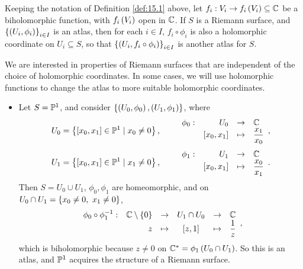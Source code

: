 \begin{remark}
Keeping the notation of Definition \ref{def:15.1} above, let $ f_i : V_i \to f_i\rb{V_i} \subseteq \C $ be a biholomorphic function, with $ f_i\rb{V_i} $ open in $ \C $. If $ S $ is a Riemann surface, and $ \cb{\rb{U_i, \phi_i}}_{i \in I} $ is an atlas, then for each $ i \in I $, $ f_i \circ \phi_i $ is also a holomorphic coordinate on $ U_i \subseteq S $, so that $ \cb{\rb{U_i, f_i \circ \phi_i}}_{i \in I} $ is another atlas for $ S $.
\end{remark}

We are interested in properties of Riemann surfaces that are independent of the choice of holomorphic coordinates. In some cases, we will use holomorphic functions to change the atlas to more suitable holomorphic coordinates.

\begin{example}
\hfill
\begin{itemize}
\item Let $ S = \P^1 $, and consider $ \cb{\rb{U_0, \phi_0}, \rb{U_1, \phi_1}} $, where
$$ U_0 = \cb{\sb{x_0, x_1} \in \P^1 \mid x_0 \ne 0}, \qquad \function[\phi_0]{U_0}{\C}{\sb{x_0, x_1}}{\dfrac{x_1}{x_0}}, $$
$$ U_1 = \cb{\sb{x_0, x_1} \in \P^1 \mid x_1 \ne 0}, \qquad \function[\phi_1]{U_1}{\C}{\sb{x_0, x_1}}{\dfrac{x_0}{x_1}}. $$
Then $ S = U_0 \cup U_1 $, $ \phi_0, \phi_1 $ are homeomorphic, and on $ U_0 \cap U_1 = \cb{x_0 \ne 0, \ x_1 \ne 0} $,
$$
\begin{array}{crcccl}
\phi_0 \circ \phi_1^{-1} : & \C \setminus \cb{0} & \to & U_1 \cap U_0 & \to & \C \\
& z & \mapsto & \sb{z, 1} & \mapsto & \dfrac{1}{z}
\end{array},
$$
which is biholomorphic because $ z \ne 0 $ on $ \C^* = \phi_1\rb{U_0 \cap U_1} $. So this is an atlas, and $ \P^1 $ acquires the structure of a Riemann surface.



\end{itemize}
\end{example}
